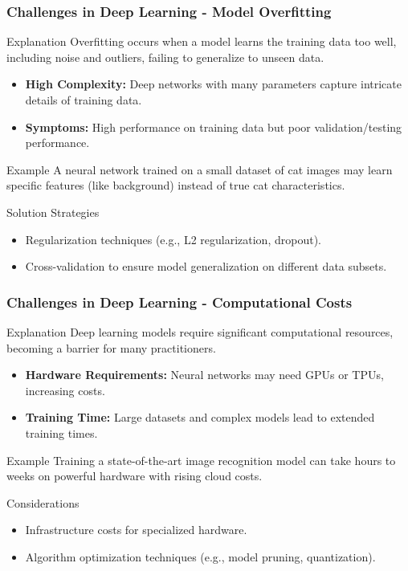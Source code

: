 \documentclass{beamer}
\begin{document}
\begin{frame}[fragile]
    \frametitle{Challenges in Deep Learning - Model Overfitting}
    \begin{block}{Explanation}
        Overfitting occurs when a model learns the training data too well, including noise and outliers, failing to generalize to unseen data.
    \end{block}
    \begin{itemize}
        \item \textbf{High Complexity:} Deep networks with many parameters capture intricate details of training data.
        \item \textbf{Symptoms:} High performance on training data but poor validation/testing performance.
    \end{itemize}
    \begin{block}{Example}
        A neural network trained on a small dataset of cat images may learn specific features (like background) instead of true cat characteristics.
    \end{block}
    \begin{block}{Solution Strategies}
        \begin{itemize}
            \item Regularization techniques (e.g., L2 regularization, dropout).
            \item Cross-validation to ensure model generalization on different data subsets.
        \end{itemize}
    \end{block}
\end{frame}

\begin{frame}[fragile]
    \frametitle{Challenges in Deep Learning - Computational Costs}
    \begin{block}{Explanation}
        Deep learning models require significant computational resources, becoming a barrier for many practitioners.
    \end{block}
    \begin{itemize}
        \item \textbf{Hardware Requirements:} Neural networks may need GPUs or TPUs, increasing costs.
        \item \textbf{Training Time:} Large datasets and complex models lead to extended training times.
    \end{itemize}
    \begin{block}{Example}
        Training a state-of-the-art image recognition model can take hours to weeks on powerful hardware with rising cloud costs.
    \end{block}
    \begin{block}{Considerations}
        \begin{itemize}
            \item Infrastructure costs for specialized hardware.
            \item Algorithm optimization techniques (e.g., model pruning, quantization).
        \end{itemize}
    \end{block}
\end{frame}
\end{document}
